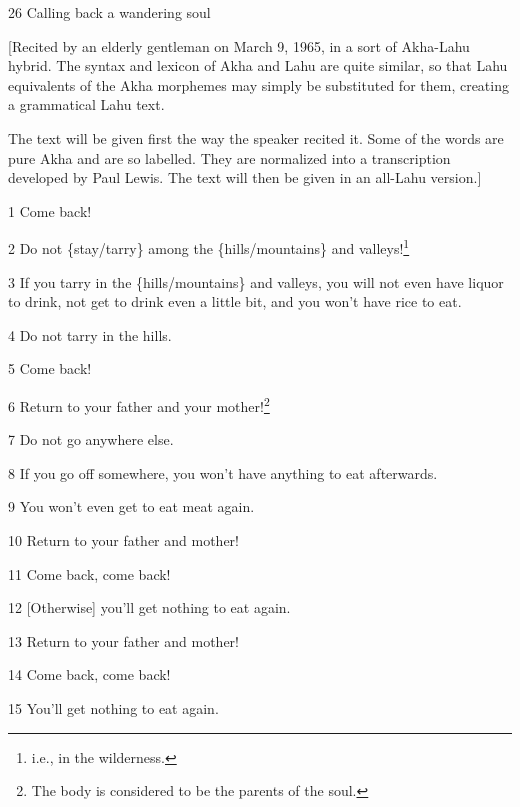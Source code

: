 
26 Calling back a wandering soul

[Recited by an elderly gentleman on March 9, 1965, in a sort of Akha-Lahu hybrid.
The syntax and lexicon of Akha and Lahu are quite similar, so that Lahu equivalents
of the Akha morphemes may simply be substituted for them, creating a grammatical
Lahu text.

The text will be given first the way the speaker recited it. Some of the words
are pure Akha and are so labelled. They are normalized into a transcription developed
by Paul Lewis. The text will then be given in an all-Lahu version.]

1 Come back!

2 Do not \{stay/tarry\} among the \{hills/mountains\} and valleys!\footnote{i.e., in the wilderness.}

3 If you tarry in the \{hills/mountains\} and valleys, you will not even have liquor
to drink, not get to drink even a little bit, and you won't have rice to eat.

4 Do not tarry in the hills.

5 Come back!

6 Return to your father and your mother!\footnote{The body is considered to be the parents of the soul.}

7 Do not go anywhere else.

8 If you go off somewhere, you won't have anything to eat afterwards.

9 You won't even get to eat meat again.

10 Return to your father and mother!

11 Come back, come back!

12 [Otherwise] you'll get nothing to eat again.

13 Return to your father and mother!

14 Come back, come back!

15 You'll get nothing to eat again.

